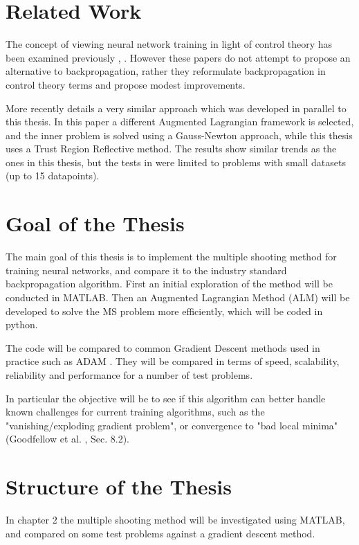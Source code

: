 \section{Related Work}
The concept of viewing neural network training in light of control theory has been examined previously \cite{dreyfus1990}, \cite{mizutani2000}. However these papers do not attempt to propose an alternative to backpropagation, rather they reformulate backpropagation in control theory terms and propose modest improvements.

More recently \cite{evens2021neural} details a very similar approach which was developed in parallel to this thesis. In this paper a different Augmented Lagrangian framework is selected, and the inner problem is solved using a Gauss-Newton approach, while this thesis uses a Trust Region Reflective method. The results show similar trends as the ones in this thesis, but the tests in \cite{evens2021neural} were limited to problems with small datasets (up to 15 datapoints).

\section{Goal of the Thesis}
The main goal of this thesis is to implement the multiple shooting method for training neural networks, and compare it to the industry standard backpropagation algorithm. First an initial exploration of the method will be conducted in MATLAB. Then an Augmented Lagrangian Method (ALM) will be developed to solve the MS problem more efficiently, which will be coded in python.

The code will be compared to common Gradient Descent methods used in practice such as ADAM \cite{kingma2017adam}. They will be compared in terms of speed, scalability, reliability and performance for a number of test problems.

In particular the objective will be to see if this algorithm can better handle known challenges for current training algorithms, such as the "vanishing/exploding gradient problem", or convergence to "bad local minima" (Goodfellow et al. \cite{Goodfellow-et-al-2016}, Sec. 8.2).

\newpage

\section{Structure of the Thesis}
In chapter 2 the multiple shooting method will be investigated using MATLAB, and compared on some test problems against a gradient descent method.


